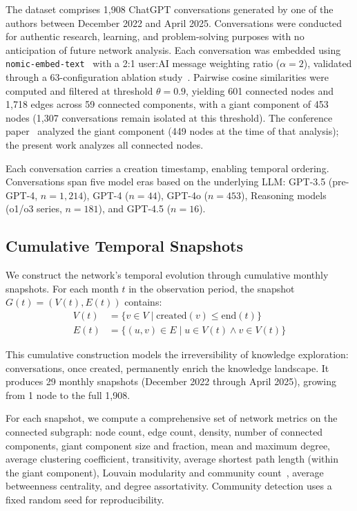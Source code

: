 \documentclass[10pt,letterpaper]{article}
\begin{document}
The dataset comprises 1{,}908 ChatGPT conversations generated by one of the authors between December 2022 and April 2025. Conversations were conducted for authentic research, learning, and problem-solving purposes with no anticipation of future network analysis. Each conversation was embedded using \texttt{nomic-embed-text}~\citep{nussbaum2024nomic} with a 2:1 user:AI message weighting ratio ($\alpha = 2$), validated through a 63-configuration ablation study~\citep{towell2025cognitive}. Pairwise cosine similarities were computed and filtered at threshold $\theta = 0.9$, yielding 601 connected nodes and 1{,}718 edges across 59 connected components, with a giant component of 453 nodes (1{,}307 conversations remain isolated at this threshold). The conference paper~\citep{towell2025cognitive} analyzed the giant component (449 nodes at the time of that analysis); the present work analyzes all connected nodes.

Each conversation carries a creation timestamp, enabling temporal ordering. Conversations span five model eras based on the underlying LLM: GPT-3.5 (pre-GPT-4, $n = 1{,}214$), GPT-4 ($n = 44$), GPT-4o ($n = 453$), Reasoning models (o1/o3 series, $n = 181$), and GPT-4.5 ($n = 16$).

\subsection{Cumulative Temporal Snapshots}
\label{sec:snapshots}

We construct the network's temporal evolution through cumulative monthly snapshots. For each month $t$ in the observation period, the snapshot $G(t) = (V(t), E(t))$ contains:
\begin{align}
  V(t) &= \{v \in V \mid \text{created}(v) \leq \text{end}(t)\} \\
  E(t) &= \{(u,v) \in E \mid u \in V(t) \wedge v \in V(t)\}
\end{align}

This cumulative construction models the irreversibility of knowledge exploration: conversations, once created, permanently enrich the knowledge landscape. It produces 29 monthly snapshots (December 2022 through April 2025), growing from 1 node to the full 1{,}908.

For each snapshot, we compute a comprehensive set of network metrics on the connected subgraph: node count, edge count, density, number of connected components, giant component size and fraction, mean and maximum degree, average clustering coefficient, transitivity, average shortest path length (within the giant component), Louvain modularity and community count~\citep{blondel2008fast}, average betweenness centrality, and degree assortativity. Community detection uses a fixed random seed for reproducibility.
\end{document}
